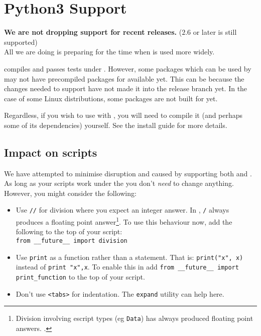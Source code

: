 
%
%
%

\chapter{Python3 Support}\label{app:py3}

\textbf{We are not dropping support for recent \pythontwo releases.} ($2.6$ or later is still supported) \\
All we are doing is preparing for the time when \pythonthree is used more widely.

\escript compiles and passes tests under \pythonthree.
However, some packages which can be used by \escript may not have precompiled packages for \pythonthree available yet.
This can be because the changes needed to support \pythonthree have not made it into the 
release branch yet. 
In the case of some Linux distributions, some packages are not built for \pythonthree yet.

Regardless, if you wish to use \escript with \pythonthree, you will need to compile it (and perhaps some of
its dependencies) yourself.
See the install guide for more details. 

\section{Impact on scripts}
We have attempted to minimise disruption and caused by supporting both \pythontwo and \pythonthree.
As long as your scripts work under the \pythontwo you don't \emph{need} to change anything.
However, you might consider the following:
\begin{itemize}
 \item Use \texttt{//} for division where you expect an integer answer. 
In \pythonthree, \texttt{/} always produces a floating point answer\footnote{Division involving escript types (eg \texttt{Data}) has always produced floating point answers. 
.}.
To use this behaviour now, add the following to the top of your script:\\
\texttt{from __future__ import division}
\item Use \texttt{print} as a function rather than a statement.
That is:  \texttt{print("x", x)}  instead of \texttt{print "x",x}.
To enable this in \pythontwo add \texttt{from __future__ import print_function} to the top of your script.
\item{Don't use \verb|<tabs>| for indentation.  The \texttt{expand} utility can help here.}
\end{itemize}

